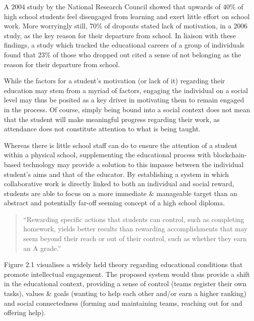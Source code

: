 A 2004 study by the National Research Council showed that upwards of
40\% of high school students feel disengaged from learning and exert
little effort on school work\cite{Usher2013}. More worryingly still, 70\% of dropouts stated
lack of motivation, in a 2006 study, as the key reason for their
departure from school\cite{bridgeland2006silent}. In liaison with these
findings, a study which tracked the educational careers of a group of
individuals found that 23\% of those who dropped out cited a sense of
not belonging as the reason for their departure from school\cite{berktold1998subsequent}.

While the factors for a student's motivation (or lack of it) regarding
their education may stem from a myriad of factors, engaging the
individual on a social level may thus be posited as a key driver in
motivating them to remain engaged in the process\cite{johnson2001students}. Of course, simply being
bound into a social context does not mean that the student will make
meaningful progress regarding their work, as attendance does not
constitute attention to what is being taught.

Whereas there is little school staff can do to ensure the attention of a
student within a physical school, supplementing the educational process
with blockchain-based technology may provide a solution to this impasse
between the individual student's aims and that of the educator. By
establishing a system in which collaborative work is directly linked to
both an individual and social reward, students are able to focus on a
more immediate \& manageable target than an abstract and potentially
far-off seeming concept of a high school diploma.

\begin{quote}
``Rewarding specific actions that students can control, such as
completing homework, yields better results than rewarding
accomplishments that may seem beyond their reach or out of their
control, such as whether they earn an A grade.''\cite{Usher2013}
\end{quote}

Figure 2.1 visualises a widely held theory regarding educational
conditions that promote intellectual engagement\cite{CommitteeonIncreasingHighSchoolStudentsEngagementandMotivationtoLearn2003}. The proposed system would thus provide
a shift in the educational context, providing a sense of control (teams
register their own tasks), values \& goals (wanting to help each other
and/or earn a higher ranking) and social connectedness (forming and
maintaining teams, reaching out for and offering help).

